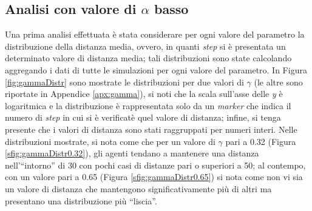 \subsection{Analisi con valore di $\alpha$ basso}
\label{subsec:gammaalow}
Una prima analisi effettuata è stata considerare per ogni valore del parametro la distribuzione della distanza media, ovvero, in quanti \textit{step} si è presentata un determinato valore di distanza media; tali distribuzioni sono state calcolando aggregando i dati di tutte le simulazioni per ogni valore del parametro.
In Figura \ref{fig:gammaDistr} sono mostrate le distribuzioni per due valori di $\gamma$ (le altre sono riportate in Appendice \ref{apx:gamma}), si noti che la scala sull'asse delle \textit{y} è logaritmica e la distribuzione è rappresentata solo da un \textit{marker} che indica il numero di \textit{step} in cui si è verificatè quel valore di distanza; infine, si tenga presente che i valori di distanza sono stati raggruppati per numeri interi.
Nelle distribuzioni mostrate, si nota come che per un valore di $\gamma$ pari a 0.32 (Figura \ref{sfig:gammaDistr0.32}), gli agenti tendano a mantenere una distanza nell'“intorno” di 30 con pochi casi di distanze pari o superiori a 50; al contempo, con un valore pari a 0.65 (Figura \ref{sfig:gammaDistr0.65}) si nota come non vi sia un valore di distanza che mantengono significativamente più di altri ma presentano una distribuzione più “liscia”.\\
